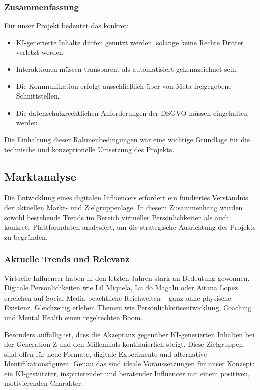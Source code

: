 \documentclass[a4paper,12pt]{article}
\begin{document}
\subsubsection*{Zusammenfassung}

Für unser Projekt bedeutet das konkret:

\begin{itemize}
    \item KI-generierte Inhalte dürfen genutzt werden, solange keine Rechte Dritter verletzt werden.
    \item Interaktionen müssen transparent als automatisiert gekennzeichnet sein.
    \item Die Kommunikation erfolgt ausschließlich über von Meta freigegebene Schnittstellen.
    \item Die datenschutzrechtlichen Anforderungen der DSGVO müssen eingehalten werden.
\end{itemize}

Die Einhaltung dieser Rahmenbedingungen war eine wichtige Grundlage für die technische und konzeptionelle Umsetzung des Projekts.


\subsection{Marktanalyse}

Die Entwicklung eines digitalen Influencers erfordert ein fundiertes Verständnis der aktuellen Markt- und Zielgruppenlage. In diesem Zusammenhang wurden sowohl bestehende Trends im Bereich virtueller Persönlichkeiten als auch konkrete Plattformdaten analysiert, um die strategische Ausrichtung des Projekts zu begründen.

\subsubsection*{Aktuelle Trends und Relevanz}

Virtuelle Influencer haben in den letzten Jahren stark an Bedeutung gewonnen. Digitale Persönlichkeiten wie Lil Miquela, Lu do Magalu oder Aitana Lopez erreichen auf Social Media beachtliche Reichweiten – ganz ohne physische Existenz. Gleichzeitig erleben Themen wie Persönlichkeitsentwicklung, Coaching und Mental Health einen regelrechten Boom.

Besonders auffällig ist, dass die Akzeptanz gegenüber KI-generierten Inhalten bei der Generation Z und den Millennials kontinuierlich steigt. Diese Zielgruppen sind offen für neue Formate, digitale Experimente und alternative Identifikationsfiguren. Genau das sind ideale Voraussetzungen für unser Konzept: ein KI-gestützter, inspirierender und beratender Influencer mit einem positiven, motivierenden Charakter.
\end{document}

